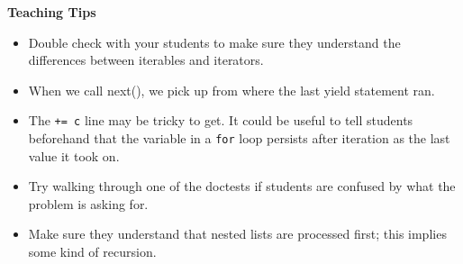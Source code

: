\begin{guide}
    \textbf{Teaching Tips}
    \begin{itemize}
       \item Double check with your students to make sure they understand the differences between iterables and iterators.
       \item When we call next(), we pick up from where the last yield statement ran.
       \item The \lstinline{+= c} line may be tricky to get. It could be useful to tell students beforehand that the variable in a \lstinline{for} loop persists after iteration as the last value it took on.
       \item Try walking through one of the doctests if students are confused by what the problem is asking for.
       \item Make sure they understand that nested lists are processed first; this implies some kind of recursion.
    \end{itemize}
 \end{guide}
